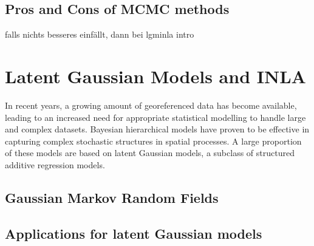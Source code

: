 \documentclass[12pt]{book}
\begin{document}
\subsection{Pros and Cons of MCMC methods}
falls nichts besseres einfällt, dann bei lgminla intro


\section{Latent Gaussian Models and INLA}
In recent years, a growing amount of georeferenced data has become available, leading to an increased need for appropriate statistical modelling to handle large and complex datasets. Bayesian hierarchical models have proven to be effective in capturing complex stochastic structures in spatial processes. A large proportion of these models are based on latent Gaussian models, a subclass of structured additive regression models. 
\subsection{Gaussian Markov Random Fields}
\subsection{Applications for latent Gaussian models}
\end{document}
